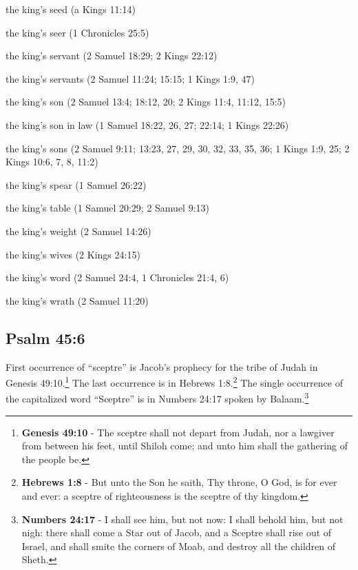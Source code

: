 \begin{compactenum}
    \item the king's seed (a Kings 11:14)
    \item the king's seer (1 Chronicles 25:5)
    \item the king's servant (2 Samuel 18:29; 2 Kings 22:12)
    \item the king's servants (2 Samuel 11:24; 15:15; 1 Kings 1:9, 47)
    \item the king's son (2 Samuel 13:4; 18:12, 20; 2 Kings 11:4, 11:12, 15:5)
    \item the king's son in law (1 Samuel 18:22, 26, 27; 22:14; 1 Kings 22:26)
    \item the king's sons (2 Samuel 9:11; 13:23, 27, 29, 30, 32, 33, 35, 36; 1 Kings 1:9, 25; 2 Kings 10:6, 7, 8, 11:2)
    \item the king's spear (1 Samuel 26:22)
    \item the king's table (1 Samuel 20:29; 2 Samuel 9:13)
    \item the king's weight (2 Samuel 14:26)
    \item the king's wives (2 Kings 24:15)
    \item the king's word (2 Samuel 24:4, 1 Chronicles 21:4, 6)
    \item the king's wrath (2 Samuel 11:20)
\end{compactenum}
\textbf{}


\subsection{Psalm 45:6}
First occurrence of ``sceptre'' is Jacob's prophecy for the tribe of Judah in Genesis 49:10.\footnote{\textbf{Genesis 49:10} - The sceptre shall not depart from Judah, nor a lawgiver from between his feet, until Shiloh come; and unto him shall the gathering of the people be.} The last occurrence is in Hebrews 1:8.\footnote{\textbf{Hebrews 1:8} - But unto the Son he saith, Thy throne, O God, is for ever and ever: a sceptre of righteousness is the sceptre of thy kingdom.} The single occurrence of the capitalized word ``Sceptre'' is in Numbers 24:17 spoken by Balaam.\footnote{\textbf{Numbers 24:17} - I shall see him, but not now: I shall behold him, but not nigh: there shall come a Star out of Jacob, and a Sceptre shall rise out of Israel, and shall smite the corners of Moab, and destroy all the children of Sheth.}
